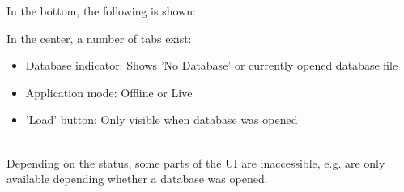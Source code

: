 In the bottom, the following is shown:

In the center, a number of tabs exist:
\begin{itemize}
 \item Database indicator: Shows 'No Database' or currently opened database file
 \item Application mode: Offline or Live
 \item 'Load' button: Only visible when database was opened
\end{itemize}
\  \\

Depending on the status, some parts of the UI are inaccessible, e.g. are only available depending whether a database was opened.
